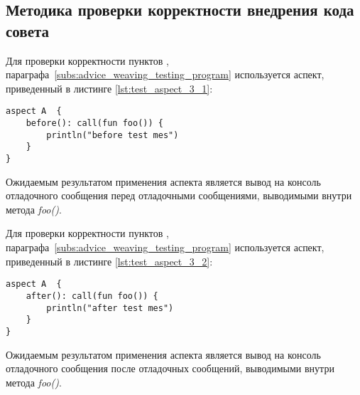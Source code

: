 \subsection{Методика проверки корректности внедрения кода совета}
\label{sub:advice_weaving_methodology}
Для проверки корректности пунктов \quotes{\ref{list:before_advice_weaving_check}},
\quotes{\ref{list:program_work_check}} параграфа~\ref{subs:advice_weaving_testing_program} используется аспект, приведенный в листинге \ref{lst:test_aspect_3_1}:
\begin{lstlisting}[style={java}, label={lst:test_aspect_3_1},
  caption={Пример тестового аспекта}]
aspect A  {
    before(): call(fun foo()) {
        println("before test mes")
    }
}
\end{lstlisting}
Ожидаемым результатом применения аспекта является  вывод на консоль отладочного сообщения  перед отладочными сообщениями, выводимыми внутри метода \textit{foo()}.

Для проверки корректности пунктов \quotes{\ref{list:after_advice_weaving_check}},
\quotes{\ref{list:program_work_check}} параграфа~\ref{subs:advice_weaving_testing_program} используется аспект, приведенный в листинге \ref{lst:test_aspect_3_2}:
\begin{lstlisting}[style={java}, label={lst:test_aspect_3_2},
  caption={Пример тестового аспекта}]
aspect A  {
    after(): call(fun foo()) {
        println("after test mes")
    }
}
\end{lstlisting}
Ожидаемым результатом применения аспекта является вывод на консоль отладочного сообщения  после отладочных сообщений, выводимыми внутри метода \textit{foo()}.

